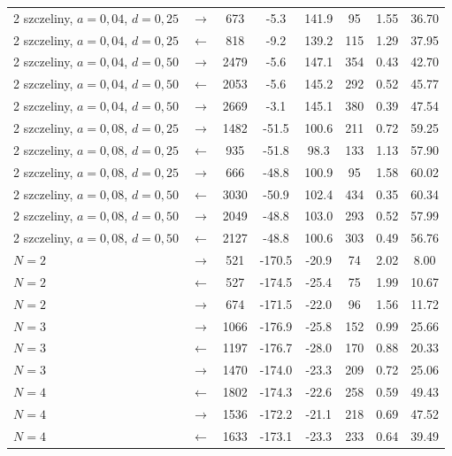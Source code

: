 \documentclass[12pt, a4paper]{article}
\begin{document}
\begin{table}[H]
\begin{tabular}{l c S[table-format=4.0] S[table-format=-3.1] S[table-format=-3.1]
                    S[table-format=3.0] S[table-format=1.2] S[table-format=2.2]}
        2 szczeliny, $a = 0{,}04$, $d = 0{,}25$ & $\rightarrow$ & 673 & -5.3 & 141.9 & 95 & 1.55 & 36.70 \\
        2 szczeliny, $a = 0{,}04$, $d = 0{,}25$ & $\leftarrow$ & 818 & -9.2 & 139.2 & 115 & 1.29 & 37.95 \\
        2 szczeliny, $a = 0{,}04$, $d = 0{,}50$ & $\rightarrow$ & 2479 & -5.6 & 147.1 & 354 & 0.43 & 42.70 \\
        2 szczeliny, $a = 0{,}04$, $d = 0{,}50$ & $\leftarrow$ & 2053 & -5.6 & 145.2 & 292 & 0.52 & 45.77 \\
        2 szczeliny, $a = 0{,}04$, $d = 0{,}50$ & $\rightarrow$ & 2669 & -3.1 & 145.1 & 380 & 0.39 & 47.54 \\
        2 szczeliny, $a = 0{,}08$, $d = 0{,}25$ & $\rightarrow$ & 1482 & -51.5 & 100.6 & 211 & 0.72 & 59.25 \\
        2 szczeliny, $a = 0{,}08$, $d = 0{,}25$ & $\leftarrow$ & 935 & -51.8 & 98.3 & 133 & 1.13 & 57.90 \\
        2 szczeliny, $a = 0{,}08$, $d = 0{,}25$ & $\rightarrow$ & 666 & -48.8 & 100.9 & 95 & 1.58 & 60.02 \\
        2 szczeliny, $a = 0{,}08$, $d = 0{,}50$ & $\leftarrow$ & 3030 & -50.9 & 102.4 & 434 & 0.35 & 60.34 \\
        2 szczeliny, $a = 0{,}08$, $d = 0{,}50$ & $\rightarrow$ & 2049 & -48.8 & 103.0 & 293 & 0.52 & 57.99 \\
        2 szczeliny, $a = 0{,}08$, $d = 0{,}50$ & $\leftarrow$ & 2127 & -48.8 & 100.6 & 303 & 0.49 & 56.76 \\
        $N = 2$ & $\rightarrow$ & 521 & -170.5 & -20.9 & 74 & 2.02 & 8.00 \\
        $N = 2$ & $\leftarrow$ & 527 & -174.5 & -25.4 & 75 & 1.99 & 10.67 \\
        $N = 2$ & $\rightarrow$ & 674 & -171.5 & -22.0 & 96 & 1.56 & 11.72 \\
        $N = 3$ & $\rightarrow$ & 1066 & -176.9 & -25.8 & 152 & 0.99 & 25.66 \\
        $N = 3$ & $\leftarrow$ & 1197 & -176.7 & -28.0 & 170 & 0.88 & 20.33 \\
        $N = 3$ & $\rightarrow$ & 1470 & -174.0 & -23.3 & 209 & 0.72 & 25.06 \\
        $N = 4$ & $\leftarrow$ & 1802 & -174.3 & -22.6 & 258 & 0.59 & 49.43 \\
        $N = 4$ & $\rightarrow$ & 1536 & -172.2 & -21.1 & 218 & 0.69 & 47.52 \\
        $N = 4$ & $\leftarrow$ & 1633 & -173.1 & -23.3 & 233 & 0.64 & 39.49 \\

\end{tabular}
\end{table}
\end{document}

